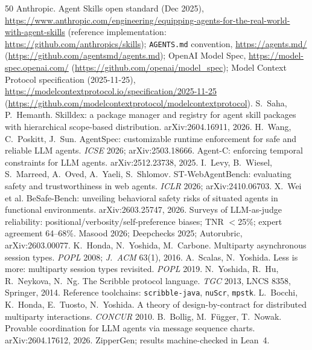 \documentclass{article}
\begin{document}
\begin{thebibliography}{50}\small
{} Anthropic. Agent Skills open standard (Dec 2025), \url{https://www.anthropic.com/engineering/equipping-agents-for-the-real-world-with-agent-skills} (reference implementation: \url{https://github.com/anthropics/skills}); \texttt{AGENTS.md} convention, \url{https://agents.md/} (\url{https://github.com/agentsmd/agents.md}); OpenAI Model Spec, \url{https://model-spec.openai.com/} (\url{https://github.com/openai/model_spec}); Model Context Protocol specification (2025-11-25), \url{https://modelcontextprotocol.io/specification/2025-11-25} (\url{https://github.com/modelcontextprotocol/modelcontextprotocol}).
 S.~Saha, P.~Hemanth. Skilldex: a package manager and registry for agent skill packages with hierarchical scope-based distribution. arXiv:2604.16911, 2026.
 H.~Wang, C.~Poskitt, J.~Sun. AgentSpec: customizable runtime enforcement for safe and reliable LLM agents. \emph{ICSE} 2026; arXiv:2503.18666.
 Agent-C: enforcing temporal constraints for LLM agents. arXiv:2512.23738, 2025.
 I.~Levy, B.~Wiesel, S.~Marreed, A.~Oved, A.~Yaeli, S.~Shlomov. ST-WebAgentBench: evaluating safety and trustworthiness in web agents. \emph{ICLR} 2026; arXiv:2410.06703.
 X.~Wei et al. BeSafe-Bench: unveiling behavioral safety risks of situated agents in functional environments. arXiv:2603.25747, 2026.
 Surveys of LLM-as-judge reliability: positional/verbosity/self-preference biases; TNR $<$25\%; expert agreement 64--68\%. Masood 2026; Deepchecks 2025; Autorubric, arXiv:2603.00077.
 K.~Honda, N.~Yoshida, M.~Carbone. Multiparty asynchronous session types. \emph{POPL} 2008; \emph{J.~ACM} 63(1), 2016.
 A.~Scalas, N.~Yoshida. Less is more: multiparty session types revisited. \emph{POPL} 2019.
 N.~Yoshida, R.~Hu, R.~Neykova, N.~Ng. The Scribble protocol language. \emph{TGC} 2013, LNCS 8358, Springer, 2014. Reference toolchains: \texttt{scribble-java}, \texttt{nuScr}, \texttt{mpstk}.
 L.~Bocchi, K.~Honda, E.~Tuosto, N.~Yoshida. A theory of design-by-contract for distributed multiparty interactions. \emph{CONCUR} 2010.
 B.~Bollig, M.~F\"ugger, T.~Nowak. Provable coordination for LLM agents via message sequence charts. arXiv:2604.17612, 2026. ZipperGen; results machine-checked in Lean~4.

\end{thebibliography}
\end{document}
